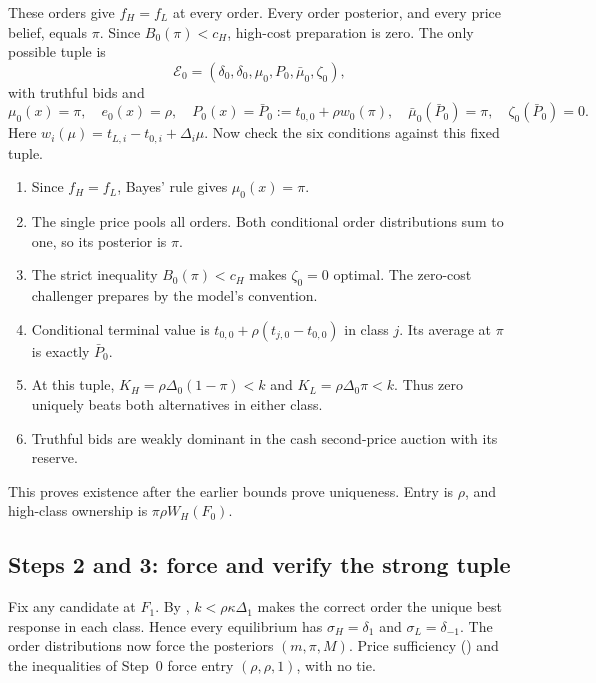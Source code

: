 These orders give $f_H=f_L$ at every order.
Every order posterior, and every price belief, equals $\pi$.
Since $B_0(\pi)<c_H$, high-cost preparation is zero.
The only possible tuple is
\[
\mathcal E_0=(\delta_0,\delta_0,\mu_0,P_0,\bar\mu_0,\zeta_0),
\]
with truthful bids and
\[
\mu_0(x)=\pi,\quad e_0(x)=\rho,\quad
P_0(x)=\bar P_0:=t_{0,0}+\rho w_0(\pi),\quad
\bar\mu_0(\bar P_0)=\pi,\quad \zeta_0(\bar P_0)=0.
\]
Here $w_i(\mu)=t_{L,i}-t_{0,i}+\Delta_i\mu$.
Now check the six conditions against this fixed tuple. 
\begin{enumerate}[label=(E\arabic*),leftmargin=3em]
\item Since $f_H=f_L$, Bayes' rule gives $\mu_0(x)=\pi$.
\item The single price pools all orders.
Both conditional order distributions sum to one, so its posterior is $\pi$.
\item The strict inequality $B_0(\pi)<c_H$ makes $\zeta_0=0$ optimal.
The zero-cost challenger prepares by the model's convention.
\item Conditional terminal value is $t_{0,0}+\rho(t_{j,0}-t_{0,0})$ in class $j$.
Its average at $\pi$ is exactly $\bar P_0$.
\item At this tuple, $K_H=\rho\Delta_0(1-\pi)<k$ and $K_L=\rho\Delta_0\pi<k$.
Thus zero uniquely beats both alternatives in either class.
\item Truthful bids are weakly dominant in the cash second-price auction with its reserve.
\end{enumerate}
This proves existence after the earlier bounds prove uniqueness.
Entry is $\rho$, and high-class ownership is $\pi\rho W_H(F_0)$.

\subsection{Steps 2 and 3: force and verify the strong tuple}
\label{sec:06_main_result-strong}

Fix any candidate at $F_1$.
By , $k<\rho\kappa\Delta_1$ makes the correct order the unique best response in each class.
Hence every equilibrium has $\sigma_H=\delta_1$ and $\sigma_L=\delta_{-1}$.
The order distributions now force the posteriors $(m,\pi,M)$.
Price sufficiency () and the inequalities of Step~0 force entry $(\rho,\rho,1)$, with no tie.

